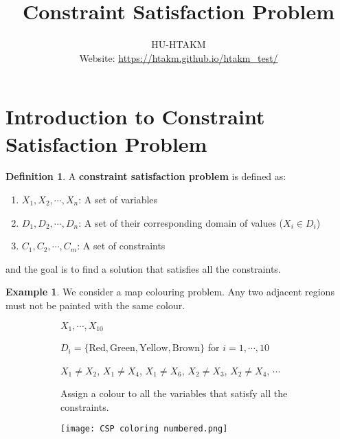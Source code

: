 \documentclass{article}
\title{
	\Huge Constraint Satisfaction Problem
}
\author{
	HU-HTAKM\\
	\small Website: \url{https://htakm.github.io/htakm_test/}
}
\theoremstyle{definition}
\newtheorem{definition}{Definition}[section]
\newtheorem{example}{Example}[definition]
\begin{document}
\maketitle
\section{Introduction to Constraint Satisfaction Problem}
\begin{definition}
	A \textbf{constraint satisfaction problem} is defined as:
	\begin{enumerate}
		\item $X_{1},X_{2},\cdots,X_{n}$: A set of variables
		\item $D_{1},D_{2},\cdots,D_{n}$: A set of their corresponding domain of values ($X_{i}\in D_{i}$)
		\item $C_{1},C_{2},\cdots,C_{m}$: A set of constraints
	\end{enumerate}
	and the goal is to find a solution that satisfies all the constraints.
\end{definition}
\begin{example}
	\label{Map colouring problem}
	We consider a map colouring problem. Any two adjacent regions must not be painted with the same colour.
	\begin{figure}[h]
		\begin{subfigure}[h]{0.6\textwidth}
			\begin{description}[style=nextline]
				\item[Variables:] $X_{1},\cdots,X_{10}$
				\item[Domain:] $D_{i}=\{\text{Red},\text{Green},\text{Yellow},\text{Brown}\}$ for $i=1,\cdots,10$
				\item[Constraint:] $X_{1}\neq X_{2}$, $X_{1}\neq X_{4}$, $X_{1}\neq X_{6}$, $X_{2}\neq X_{3}$, $X_{2}\neq X_{4}$, $\cdots$
				\item[Goal:] Assign a colour to all the variables that satisfy all the constraints.
			\end{description}
		\end{subfigure}
		\begin{subfigure}[h]{0.39\textwidth}
			\texttt{[image: CSP coloring numbered.png]}
		\end{subfigure}
	\end{figure}
\end{example}
\end{document}
